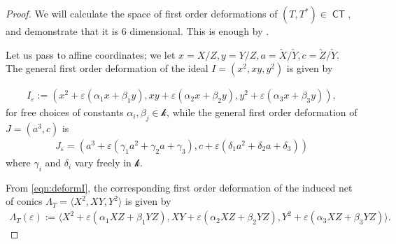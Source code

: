 \documentclass[reqno, 11pt]{amsart}
\theoremstyle{plain}
\theoremstyle{remark}
\renewcommand{\k}{\mathscr{k}}
\DeclareMathOperator{\CT}{\mathsf{CT}}
\begin{document}
\begin{proof}
  We will calculate the space of first order deformations of
  $(T, T^{*}) \in \CT$, and demonstrate that it is $6$ dimensional. This is enough by .

  Let us pass to affine coordinates; we let
  $x = X/Z, y = Y/Z, a = \check{X}/\check{Y}, c = \check{Z}/\check{Y}$. The general first order
  deformation of the ideal $I = (x^{2},xy,y^{2})$ is given by

\begin{eqnarray}\label{eqn:deformI}
  I_{\varepsilon} := (x^{2} + \varepsilon(\alpha_{1}x + \beta_{1}y), xy + \varepsilon(\alpha_{2}x + \beta_{2}y), y^{2}+ \varepsilon(\alpha_{3}x+\beta_{3}y)),
\end{eqnarray}
for free choices of constants $\alpha_{i}, \beta_{j} \in \k$, while the
general first order deformation of $J = (a^{3}, c)$ is
\begin{eqnarray}\label{eqn:deformJ}
  J_{\varepsilon} = (a^{3} + \varepsilon(\gamma_{1}a^{2}+\gamma_{2}a+\gamma_{3}), c + \varepsilon(\delta_{1}a^{2}+\delta_{2}a + \delta_{3}))
\end{eqnarray}
where $\gamma_{i}$ and $\delta_{i}$ vary freely in $\k$.

From \eqref{eqn:deformI}, the corresponding first order deformation of
the induced net of conics
$\Lambda_{T} = \langle X^{2}, XY, Y^{2} \rangle$ is given by
\begin{eqnarray}\label{eqn:deformnet}
  \Lambda_{T}(\varepsilon) := \langle X^{2} + \varepsilon(\alpha_{1}XZ + \beta_{1}YZ), XY + \varepsilon(\alpha_{2}XZ + \beta_{2}YZ), Y^{2}+ \varepsilon(\alpha_{3}XZ+\beta_{3}YZ) \rangle.
\end{eqnarray}


\end{proof}
\end{document}
